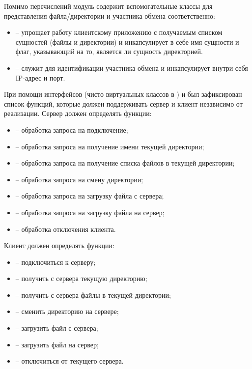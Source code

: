 \noindent Помимо перечислений модуль содержит вспомогательные классы для представления файла/директории и участника обмена соответственно:
\begin{itemize}
	\item {} -- упрощает работу клиентскому приложению с получаемым списком сущностей (файлы и директории) и инкапсулирует в себе имя сущности и флаг, указывающий на то, является ли сущность директорией.
	\item {} -- служит для идентификации участника обмена и инкапсулирует внутри себя IP-адрес и порт.
\end{itemize}

\noindent При помощи интерфейсов (чисто виртуальных классов в )  и  был зафиксирован список функций, которые должен поддерживать сервер и клиент независимо от реализации. Сервер должен определять функции:
\begin{itemize}
	\item {} -- обработка запроса на подключение;
	\item {} -- обработка запроса на получение имени текущей директории;
	\item {} -- обработка запроса на получение списка файлов в текущей директории;
	\item {} -- обработка запроса на смену директории;
	\item {} -- обработка запроса на загрузку файла с сервера;
	\item {} -- обработка запроса на загрузку файла на сервер;
	\item {} -- обработка отключения клиента.
\end{itemize}

\noindent Клиент должен определять функции:
\begin{itemize}
	\item {} -- подключиться к серверу;
	\item {} -- получить с сервера текущую директорию;
	\item {} -- получить с сервера файлы в текущей директории;
	\item {} -- сменить директорию на сервере;
	\item {} -- загрузить файл с сервера;
	\item {} -- загрузить файл на сервер; 
	\item {} -- отключиться от текущего сервера.
\end{itemize}

